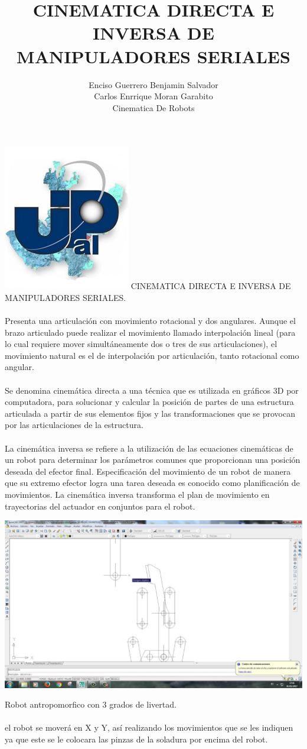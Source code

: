 \documentclass[12pt,a4paper]{article}
\author{Enciso Guerrero Benjamin Salvador\\
Carlos Enrrique Moran Garabito\\
Cinematica De Robots }
\title{CINEMATICA DIRECTA E INVERSA DE MANIPULADORES SERIALES}
\begin{document}
\maketitle
\includegraphics[scale=1.8]{upzmgg.jpg} 
\newpage
CINEMATICA DIRECTA E INVERSA DE MANIPULADORES SERIALES.
\\\\
Presenta una articulación con movimiento rotacional y dos angulares. Aunque el brazo articulado puede realizar el movimiento llamado interpolación lineal (para lo cual requiere mover simultáneamente dos o tres de sus articulaciones), el movimiento natural es el de interpolación por articulación, tanto rotacional como angular. \\\\
Se denomina cinemática directa a una técnica que es utilizada en gráficos 3D por computadora, para solucionar y calcular la posición de partes de una estructura articulada a partir de sus elementos fijos y las transformaciones que se provocan por las articulaciones de la estructura. \\\\
La cinemática inversa se refiere a la utilización de las ecuaciones cinemáticas de un robot para determinar los parámetros comunes que proporcionan una posición deseada del efector final. Especificación del movimiento de un robot de manera que su extremo efector logra una tarea deseada es conocido como planificación de movimientos. La cinemática inversa transforma el plan de movimiento en trayectorias del actuador en conjuntos para el robot. 
\begin{center}
\includegraphics[scale=0.37]{2d.jpg} 
\end{center}
Robot antropomorfico con 3 grados de livertad. \\\\
el robot se moverá en X y Y, así realizando los movimientos que se les indiquen ya que este se le colocara las pinzas de la soladura por encima del robot. 
\end{document}
